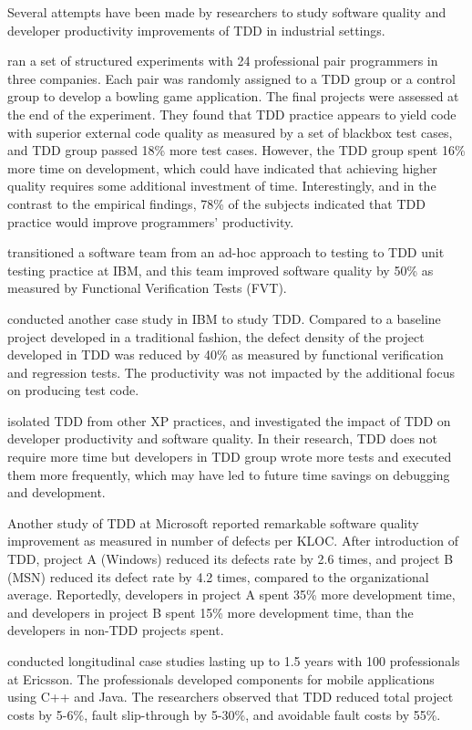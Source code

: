 \documentclass[smallextended]{svjour3}     %
\begin{document}
Several attempts have been made by researchers to study software quality
and developer productivity improvements of TDD in industrial settings.  

\cite{George:04} ran a set of structured experiments
with 24 professional pair programmers in three companies. Each pair was
randomly assigned to a TDD group or a control group to develop a bowling
game application. The final projects were assessed at the end of the
experiment.  They found that TDD practice appears to yield code with
superior external code quality as measured by a set of blackbox test cases,
and TDD group passed 18\% more test cases. However, the TDD group spent
16\% more time on development, which could have indicated that achieving
higher quality requires some additional investment of time. Interestingly,
and in the contrast to the empirical findings, 78\% of the subjects
indicated that TDD practice would improve programmers' productivity.

\cite{Maximilien:03} transitioned a software team
from an ad-hoc approach to testing to TDD unit testing practice at IBM, and
this team improved software quality by 50\% as measured by Functional
Verification Tests (FVT).

\cite{Williams:03} conducted another case
study in IBM to study TDD. Compared to a baseline project developed in a 
traditional fashion, the defect density of the project developed 
in TDD was reduced by 40\% as measured by functional verification and 
regression tests. The productivity was not impacted by the additional 
focus on producing test code. 

\cite{Geras:04} isolated TDD from other XP
practices, and investigated the impact of TDD on developer productivity and
software quality. In their research, TDD does not require more time but
developers in TDD group wrote more tests and executed them more frequently,
which may have led to future time savings on debugging and development.

Another study of TDD at Microsoft 
\citep{Bhat:06} reported remarkable software quality improvement as 
measured in number of defects per KLOC. After introduction of TDD, 
project A (Windows) reduced its defects rate by 2.6 times, and project 
B (MSN) reduced its defect rate by 4.2 times, compared to the organizational
average. Reportedly, developers in project A spent 35\% more development
time, and developers in project B spent 15\% more development time, than
the developers in non-TDD projects spent.

\cite{Damm:06} conducted longitudinal case studies lasting up to 1.5 years with 100 professionals at Ericsson. 
The professionals
developed components for mobile applications using C++ and Java. The researchers observed that TDD reduced total 
project costs by 5-6\%, fault slip-through by 5-30\%, and 
avoidable fault costs by 55\%.  
\end{document}
